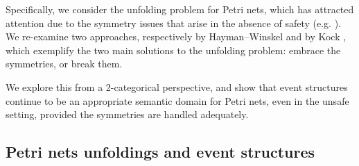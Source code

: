 \documentclass[11pt,a4paper]{article}
\theoremstyle{plain}
\theoremstyle{definition}
\theoremstyle{remark}
\begin{document}
Specifically, we consider the unfolding problem for  Petri nets, which has attracted attention due to the symmetry issues that arise in the absence of safety (e.g. \cite{meseguer1997semantics}). We re-examine two approaches, respectively by Hayman--Winskel \cite{GENUN} and by Kock \cite{WGPN}, which exemplify the two main solutions to the unfolding problem: embrace the symmetries, or break them. 

We explore this from a 2-categorical perspective, and show that event structures \cite{ES1} continue to be an appropriate semantic domain for Petri nets, even in the unsafe setting, provided the symmetries are handled adequately.

\subsection{Petri nets unfoldings and event structures}
\end{document}
